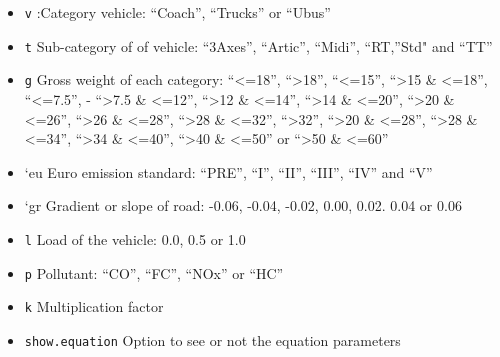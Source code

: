\documentclass[12pt,graybox,envcountchap,sectrefs]{krantz}
\providecommand{\tightlist}{%
  \setlength{\itemsep}{0pt}\setlength{\parskip}{0pt}}
\theoremstyle{definition}
\theoremstyle{definition}
\theoremstyle{definition}
\theoremstyle{remark}
\begin{document}
\begin{itemize}
\tightlist
\item
  \texttt{v} :Category vehicle: ``Coach'', ``Trucks'' or ``Ubus''
\item
  \texttt{t} Sub-category of of vehicle: ``3Axes'', ``Artic'', ``Midi'',
  ``RT,''Std" and ``TT''
\item
  \texttt{g} Gross weight of each category: ``\textless{}=18'',
  ``\textgreater{}18'', ``\textless{}=15'', ``\textgreater{}15 \&
  \textless{}=18'', ``\textless{}=7.5'', - ``\textgreater{}7.5 \&
  \textless{}=12'', ``\textgreater{}12 \& \textless{}=14'',
  ``\textgreater{}14 \& \textless{}=20'', ``\textgreater{}20 \&
  \textless{}=26'', ``\textgreater{}26 \& \textless{}=28'',
  ``\textgreater{}28 \& \textless{}=32'', ``\textgreater{}32'',
  ``\textgreater{}20 \& \textless{}=28'', ``\textgreater{}28 \&
  \textless{}=34'', ``\textgreater{}34 \& \textless{}=40'',
  ``\textgreater{}40 \& \textless{}=50'' or ``\textgreater{}50 \&
  \textless{}=60''
\item
  `eu Euro emission standard: ``PRE'', ``I'', ``II'', ``III'', ``IV''
  and ``V''
\item
  `gr Gradient or slope of road: -0.06, -0.04, -0.02, 0.00, 0.02. 0.04
  or 0.06
\item
  \texttt{l} Load of the vehicle: 0.0, 0.5 or 1.0
\item
  \texttt{p} Pollutant: ``CO'', ``FC'', ``NOx'' or ``HC''
\item
  \texttt{k} Multiplication factor
\item
  \texttt{show.equation} Option to see or not the equation parameters
\end{itemize}
\end{document}
